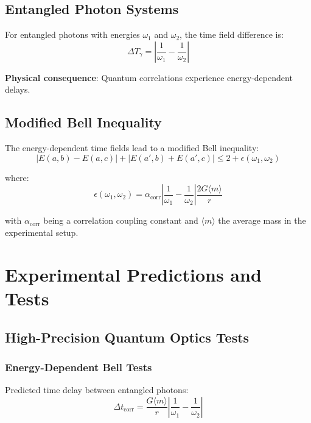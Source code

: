 	\subsection{Entangled Photon Systems}
	
	For entangled photons with energies $\omega_1$ and $\omega_2$, the time field difference is:
	\begin{equation}
		\Delta T_\gamma = \left|\frac{1}{\omega_1} - \frac{1}{\omega_2}\right|
		\label{eq:time_field_difference}
	\end{equation}
	
	\textbf{Physical consequence}: Quantum correlations experience energy-dependent delays.
	
	\subsection{Modified Bell Inequality}
	
	The energy-dependent time fields lead to a modified Bell inequality:
	\begin{equation}
		|E(a,b) - E(a,c)| + |E(a',b) + E(a',c)| \leq 2 + \epsilon(\omega_1, \omega_2)
		\label{eq:modified_bell_inequality}
	\end{equation}
	
	where:
	\begin{equation}
		\epsilon(\omega_1, \omega_2) = \alpha_{\text{corr}} \left|\frac{1}{\omega_1} - \frac{1}{\omega_2}\right| \frac{2G\langle m \rangle}{r}
		\label{eq:bell_correction}
	\end{equation}
	
	with $\alpha_{\text{corr}}$ being a correlation coupling constant and $\langle m \rangle$ the average mass in the experimental setup.

	\section{Experimental Predictions and Tests}
	
	\subsection{High-Precision Quantum Optics Tests}
	
	\subsubsection{Energy-Dependent Bell Tests}
	
	Predicted time delay between entangled photons:
	\begin{equation}
		\Delta t_{\text{corr}} = \frac{G\langle m \rangle}{r} \left|\frac{1}{\omega_1} - \frac{1}{\omega_2}\right|
		\label{eq:correlation_time_delay}
	\end{equation}
	

